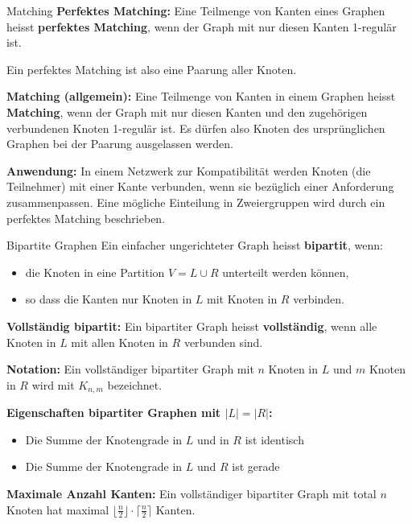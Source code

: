 \documentclass[a4paper, fontsize=7pt]{scrartcl}
\begin{document}
\begin{mainbox}{Matching}
\textbf{Perfektes Matching:}
Eine Teilmenge von Kanten eines Graphen heisst \textbf{perfektes Matching}, wenn der Graph mit nur diesen Kanten 1-regul\"ar ist.

Ein perfektes Matching ist also eine Paarung aller Knoten.

\textbf{Matching (allgemein):}
Eine Teilmenge von Kanten in einem Graphen heisst \textbf{Matching}, wenn der Graph mit nur diesen Kanten und den zugeh\"origen verbundenen Knoten 1-regul\"ar ist. Es d\"urfen also Knoten des urspr\"unglichen Graphen bei der Paarung ausgelassen werden.

\textbf{Anwendung:}
In einem Netzwerk zur Kompatibilit\"at werden Knoten (die Teilnehmer) mit einer Kante verbunden, wenn sie bez\"uglich einer Anforderung zusammenpassen. Eine m\"ogliche Einteilung in Zweiergruppen wird durch ein perfektes Matching beschrieben.
\end{mainbox}

\begin{mainbox}{Bipartite Graphen}
Ein einfacher ungerichteter Graph heisst \textbf{bipartit}, wenn:

\begin{itemize}
    \item die Knoten in eine Partition $V = L \cup R$ unterteilt werden k\"onnen,
    \item so dass die Kanten nur Knoten in $L$ mit Knoten in $R$ verbinden.
\end{itemize}

\textbf{Vollst\"andig bipartit:}
Ein bipartiter Graph heisst \textbf{vollst\"andig}, wenn alle Knoten in $L$ mit allen Knoten in $R$ verbunden sind.

\textbf{Notation:} Ein vollst\"andiger bipartiter Graph mit $n$ Knoten in $L$ und $m$ Knoten in $R$ wird mit $K_{n,m}$ bezeichnet.

\textbf{Eigenschaften bipartiter Graphen mit $|L| = |R|$:}
\begin{itemize}
    \item Die Summe der Knotengrade in $L$ und in $R$ ist identisch
    \item Die Summe der Knotengrade in $L$ und $R$ ist gerade
\end{itemize}

\textbf{Maximale Anzahl Kanten:}
Ein vollst\"andiger bipartiter Graph mit total $n$ Knoten hat maximal $\lfloor \frac{n}{2} \rfloor \cdot \lceil \frac{n}{2} \rceil$ Kanten.
\end{mainbox}
\end{document}
